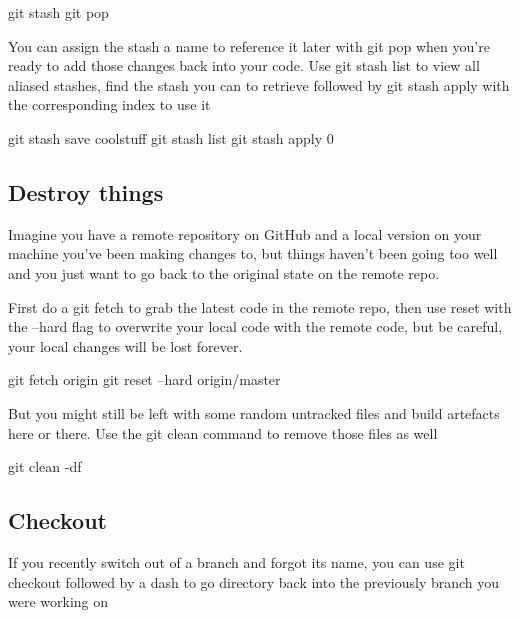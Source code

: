 \begin{console}
    git stash
    git pop
\end{console}

You can assign the stash a name to reference it later with git pop when you're ready to add those changes back into your code. Use git stash list to view all aliased stashes, find the stash you can to retrieve followed by git stash apply with the corresponding index to use it

\begin{console}
    git stash save coolstuff
    git stash list
    git stash apply 0
\end{console}



\subsection{Destroy things}

Imagine you have a remote repository on GitHub and a local version on your machine you've been making changes to, but things haven't been going too well and you just want to go back to the original state on the remote repo.

First do a git fetch to grab the latest code in the remote repo, then use reset with the --hard flag to overwrite your local code with the remote code, but be careful, your local changes will be lost forever.

\begin{console}
    git fetch origin
    git reset --hard origin/master
\end{console}

But you might still be left with some random untracked files and build artefacts here or there. Use the git clean command to remove those files as well

\begin{console}
    git clean -df
\end{console}



\subsection{Checkout}

If you recently switch out of a branch and forgot its name, you can use git checkout followed by a dash to go directory back into the previously branch you were working on

